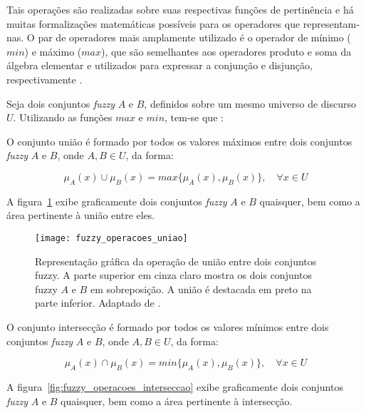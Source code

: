 Tais operações são realizadas sobre suas respectivas funções de pertinência e há muitas formalizações matemáticas possíveis para os operadores que representam-nas. O par de operadores mais amplamente utilizado é o operador de mínimo ($min$) e máximo ($max$), que são semelhantes aos operadores produto e soma da álgebra elementar e utilizados para expressar a conjunção e disjunção, respectivamente \citep{thole:79}.

Seja dois conjuntos \emph{fuzzy} $A$ e $B$, definidos sobre um mesmo universo de discurso $U$. Utilizando as funções $max$ e $min$, tem-se que \citep{klir:95}:

\begin{defn}
\label{def:conjunto_fuzzy_uniao}
O conjunto união é formado por todos os valores máximos entre dois conjuntos \emph{fuzzy} $A$ e $B$, onde $A, B \in U$, da forma:

\begin{equation}
  \mu_A(x) \cup \mu_B(x) = max\{\mu_A(x), \mu_B(x)\}, \quad \forall x \in U
\end{equation}
\end{defn}

A figura~\ref{fig:fuzzy_operacoes_uniao} exibe graficamente dois conjuntos \emph{fuzzy} $A$ e $B$ quaisquer, bem como a área pertinente à união entre eles.

\begin{figure}[!h]
  \centering
  \texttt{[image: fuzzy\_operacoes\_uniao]}
  \caption[Operação de união entre dois conjuntos fuzzy]{Representação gráfica da operação de união entre dois conjuntos fuzzy. A parte superior em cinza claro mostra os dois conjuntos fuzzy $A$ e $B$ em sobreposição. A união é destacada em preto na parte inferior. Adaptado de \citet{vrusias:06}.}
  \label{fig:fuzzy_operacoes_uniao}
\end{figure}

\begin{defn}
\label{def:conjunto_fuzzy_interseccao}
O conjunto intersecção é formado por todos os valores mínimos entre dois conjuntos \emph{fuzzy} $A$ e $B$, onde $A, B \in U$, da forma:

\begin{equation}
  \mu_A(x) \cap \mu_B(x) = min\{\mu_A(x), \mu_B(x)\}, \quad \forall x \in U
\end{equation}
\end{defn}

A figura~\ref{fig:fuzzy_operacoes_interseccao} exibe graficamente dois conjuntos \emph{fuzzy} $A$ e $B$ quaisquer, bem como a área pertinente à intersecção.

